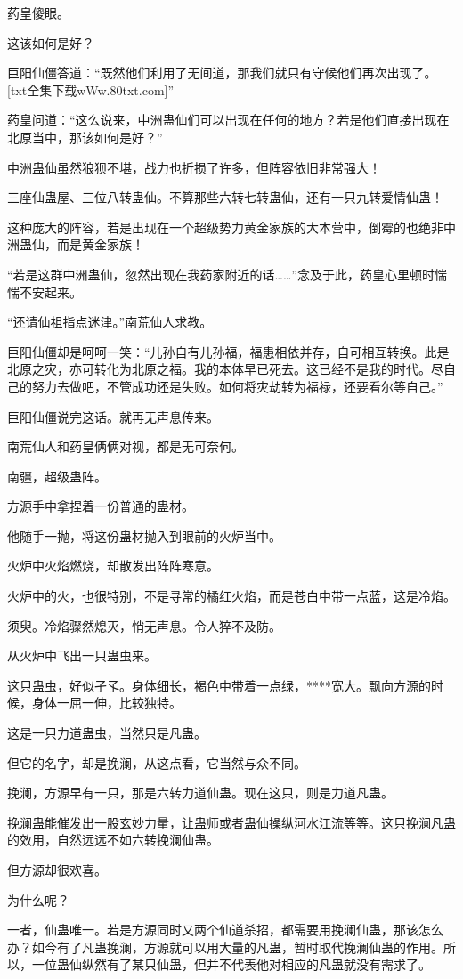 \begin{this_body}
药皇傻眼。

这该如何是好？

巨阳仙僵答道：“既然他们利用了无间道，那我们就只有守候他们再次出现了。[txt全集下载wWw.80txt.com]”

药皇问道：“这么说来，中洲蛊仙们可以出现在任何的地方？若是他们直接出现在北原当中，那该如何是好？”

中洲蛊仙虽然狼狈不堪，战力也折损了许多，但阵容依旧非常强大！

三座仙蛊屋、三位八转蛊仙。不算那些六转七转蛊仙，还有一只九转爱情仙蛊！

这种庞大的阵容，若是出现在一个超级势力黄金家族的大本营中，倒霉的也绝非中洲蛊仙，而是黄金家族！

“若是这群中洲蛊仙，忽然出现在我药家附近的话……”念及于此，药皇心里顿时惴惴不安起来。

“还请仙祖指点迷津。”南荒仙人求教。

巨阳仙僵却是呵呵一笑：“儿孙自有儿孙福，福患相依并存，自可相互转换。此是北原之灾，亦可转化为北原之福。我的本体早已死去。这已经不是我的时代。尽自己的努力去做吧，不管成功还是失败。如何将灾劫转为福禄，还要看尔等自己。”

巨阳仙僵说完这话。就再无声息传来。

南荒仙人和药皇俩俩对视，都是无可奈何。

南疆，超级蛊阵。

方源手中拿捏着一份普通的蛊材。

他随手一抛，将这份蛊材抛入到眼前的火炉当中。

火炉中火焰燃烧，却散发出阵阵寒意。

火炉中的火，也很特别，不是寻常的橘红火焰，而是苍白中带一点蓝，这是冷焰。

须臾。冷焰骤然熄灭，悄无声息。令人猝不及防。

从火炉中飞出一只蛊虫来。

这只蛊虫，好似孑孓。身体细长，褐色中带着一点绿，****宽大。飘向方源的时候，身体一屈一伸，比较独特。

这是一只力道蛊虫，当然只是凡蛊。

但它的名字，却是挽澜，从这点看，它当然与众不同。

挽澜，方源早有一只，那是六转力道仙蛊。现在这只，则是力道凡蛊。

挽澜蛊能催发出一股玄妙力量，让蛊师或者蛊仙操纵河水江流等等。这只挽澜凡蛊的效用，自然远远不如六转挽澜仙蛊。

但方源却很欢喜。

为什么呢？

一者，仙蛊唯一。若是方源同时又两个仙道杀招，都需要用挽澜仙蛊，那该怎么办？如今有了凡蛊挽澜，方源就可以用大量的凡蛊，暂时取代挽澜仙蛊的作用。所以，一位蛊仙纵然有了某只仙蛊，但并不代表他对相应的凡蛊就没有需求了。


\end{this_body}
